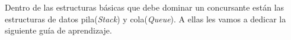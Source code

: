 Dentro de las estructuras básicas que debe dominar un concursante están las estructuras de datos pila(\emph{Stack}) y cola(\emph{Queue}). A ellas les vamos a dedicar la siguiente guía de aprendizaje.